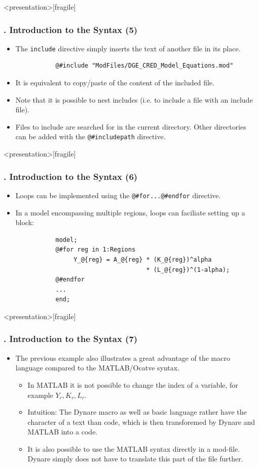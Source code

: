 \documentclass[11pt,aspectratio=169]{beamer}
\begin{document}
\begin{frame}<presentation>[fragile]
	\frametitle{{\thesection.\thesubsection\thinspace\thesubsubsection} Introduction to the Syntax (5)}
	\begin{itemize}
		\item The \texttt{include} directive simply inserts the text of another file in its place.
		\begin{verbatim}
		   @#include "ModFiles/DGE_CRED_Model_Equations.mod"
		\end{verbatim}
		\item It is equivalent to copy/paste of the content of the included file.
		\item Note that it is possible to nest includes (i.e. to include a file with an include file).
		\item Files to include are searched for in the current directory. Other directories can be added with the \texttt{@\#includepath} directive.
	\end{itemize}
\end{frame}
\begin{frame}<presentation>[fragile]
	\frametitle{{\thesection.\thesubsection\thinspace\thesubsubsection} Introduction to the Syntax (6)}
	\begin{itemize}
		\item Loops can be implemented using the \texttt{@\#for...@\#endfor} directive.
		\item In a model encompassing multiple regions, loops can faciliate setting up a  block:
		\begin{verbatim}
		   model;
		   @#for reg in 1:Regions
		        Y_@{reg} = A_@{reg} * (K_@{reg})^alpha 
		                            * (L_@{reg})^(1-alpha);
		   @#endfor
		   ...
		   end;
		\end{verbatim}
	\end{itemize}
\end{frame}
\begin{frame}<presentation>[fragile]
	\frametitle{{\thesection.\thesubsection\thinspace\thesubsubsection} Introduction to the Syntax (7)}
	\begin{itemize}
		\item The previous example also illustrates a great advantage of the macro language compared to the MATLAB/Ocatve syntax. 
		\begin{itemize}
			\item In MATLAB it is not possible to change the index of a variable, for example $Y_r,K_r,L_r$.
			\item Intuition: The Dynare macro as well as basic language rather have the character of a text than code, which is then transforemed by Dynare and MATLAB into a code.
			\item It is also possible to use the MATLAB syntax directly in a mod-file. Dynare simply does not have to translate this part of the file further.
		\end{itemize}
	\end{itemize}
\end{frame}
\end{document}
